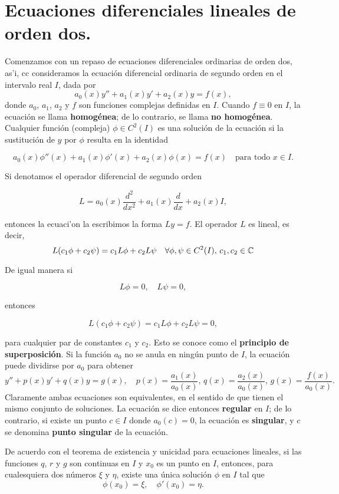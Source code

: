 \documentclass[main.tex]{subfiles}
\begin{document}
\section{Ecuaciones diferenciales lineales de orden dos.}
\noindent Comenzamos con un repaso de ecuaciones diferenciales ordinarias de orden dos, as'i, cc consideramos la ecuación diferencial ordinaria de segundo orden en el intervalo real \( I \), dada por
\[
a_0(x)y''+a_1(x)y'+a_2(x)y= f(x),
\]
donde \(a_0\), \(a_1\), \(a_2\) y \(f\) son funciones complejas definidas en \(I\). Cuando \(f\equiv 0\) en \(I\), la ecuación se llama \textbf{homogénea}; de lo contrario, se llama \textbf{no homogénea}. Cualquier función (compleja) \(\phi \in C^2(I)\) es una solución de la ecuación si la sustitución de \(y\) por \(\phi\) resulta en la identidad

\[
a_0(x)\phi''(x)+a_1(x)\phi'(x)+a_2(x)\phi(x)=f(x) \quad \text{para todo }x\in I.
\]

Si denotamos el operador diferencial de segundo orden

\[
L=a_0(x)\frac{d^2}{dx^2}+a_1(x)\frac{d}{dx}+a_2(x)I,
\]

entonces la ecuaci'on la escribimos la forma \(Ly= f\). El operador \(L\) es lineal, es decir,
\[
L(c_1\phi+c_2\psi)=c_1L\phi+c_2 L\psi\quad\forall\phi,\psi \in C^2(I),\,c_1,c_2\in\mathbb C 
\]

De igual manera si

\[
L\phi = 0, \quad L\psi=0,
\]

entonces

\[
L(c_1\phi+c_2\psi)=c_1L\phi+c_2L\psi=0,
\]

para cualquier par de constantes \(c_1\) y \(c_2\). Esto se conoce como el \textbf{principio de superposición}.
Si la función \(a_0\) no se anula en ningún punto de \(I\), la ecuación puede dividirse por \(a_0\) para obtener
\[
y'' + p(x) y' + q(x) y = g(x),\quad p(x)=\frac{a_1(x)}{a_0(x)},\,q(x)=\frac{a_2(x)}{a_0(x)},\,g(x)=\frac{f(x)}{a_0(x)}.
\]
Claramente ambas ecuaciones son equivalentes, en el sentido de que tienen el mismo conjunto de soluciones. La ecuación se dice entonces \textbf{regular} en \(I\); de lo contrario, si existe un punto \(c\in I\) donde \(a_0(c)=0\), la ecuación es \textbf{singular}, y \(c\) se denomina \textbf{punto singular} de la ecuación.

De acuerdo con el teorema de existencia y unicidad para ecuaciones lineales, si las funciones \(q\), \(r\) y \(g\) son continuas en \(I\) y \(x_0\) es un punto en \(I\), entonces, para cualesquiera dos números \(\xi\) y \(\eta\), existe una única solución \(\phi\) en \(I\) tal que
\[
\phi(x_0) = \xi, \quad \phi'(x_0) = \eta.
\]
\end{document}
